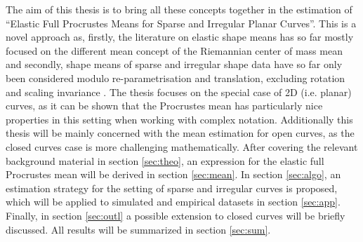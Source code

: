 The aim of this thesis is to bring all these concepts together in the
estimation of \enquote{Elastic Full Procrustes Means for Sparse and Irregular
Planar Curves}. 
This is a novel approach as, firstly, the literature on elastic shape means has
so far mostly focused on the different mean concept of the Riemannian center of
mass mean \parencite{SrivastavaEtAl2011} and secondly, shape means of
sparse and irregular shape data have so far only been considered modulo
re-parametrisation and translation, excluding rotation and scaling invariance
\parencite{Steyer2021}.
The thesis focuses on the special case of 2D (i.e. planar) curves, as it can be
shown that the Procrustes mean has particularly nice properties in this
setting when working with complex notation.
Additionally this thesis will be mainly concerned with the mean estimation for
open curves, as the closed curves case is more challenging mathematically.
After covering the relevant background material  in section \ref{sec:theo}, an
expression for the elastic full Procrustes mean will be derived in section
\ref{sec:mean}.
In section \ref{sec:algo}, an estimation strategy for the setting of sparse and
irregular curves is proposed, which will be applied to simulated and empirical
datasets in section \ref{sec:app}.
Finally, in section \ref{sec:outl} a possible extension to closed curves will
be briefly discussed.
All results will be summarized in section \ref{sec:sum}.

\newpage
